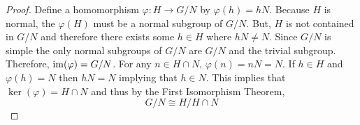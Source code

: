 \documentclass[../AlgebraQualSolutions.tex]{subfiles}
\begin{document}
	\begin{proof}
	Define a homomorphism $\varphi: H \to G/N$ by $\varphi(h) = hN$. Because $H$ is normal, the $\varphi(H)$ must be a normal subgroup of $G/N$. But, $H$ is not contained in $G/N$ and therefore there exists some $h\in H$ where $hN \neq N$. Since $G/N$ is simple the only normal subgroups of $G/N$ are $G/N$ and the trivial subgroup. Therefore, $\mathrm{im}(\varphi) = G/N$. For any $n \in H \cap N$, $\varphi(n) = nN = N$. If $h \in H$ and $\varphi(h) = N$ then $hN = N$ implying that $h \in N$. This implies that $\ker(\varphi) = H\cap N$ and thus by the First Isomorphism Theorem,
		\[G/N \cong H/H\cap N\]
	\end{proof}
\end{document}
